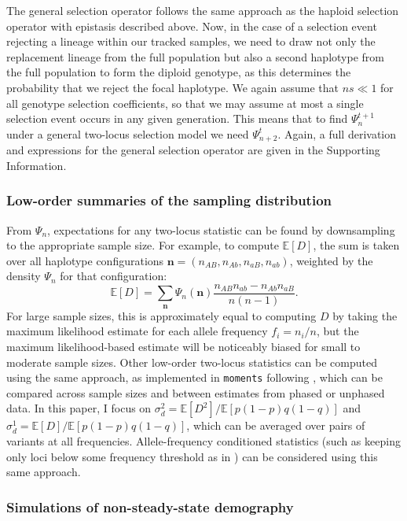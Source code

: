 \documentclass[]{article}
\newcommand{\E}{\mathbb{E}}
\begin{document}
The general selection operator follows the same approach as the haploid
selection operator with epistasis described above. Now, in the case of a
selection event rejecting a lineage within our tracked samples, we need to draw
not only the replacement lineage from the full population but also a second
haplotype from the full population to form the diploid genotype, as this
determines the probability that we reject the focal haplotype. We again assume
that \(ns \ll 1\) for all genotype selection coefficients, so that we may
assume at most a single selection event occurs in any given generation. This
means that to find \(\Psi_n^{t+1}\) under a general two-locus selection model
we need \(\Psi_{n+2}^t\). Again, a full derivation and expressions for the
general selection operator are given in the Supporting Information.

\subsubsection{Low-order summaries of the sampling distribution}

From \(\Psi_n\), expectations for any two-locus statistic can be found by
downsampling to the appropriate sample size. For example, to compute \(\E[D]\),
the sum is taken over all haplotype configurations \(\mathbf{n} = (n_{AB},
n_{Ab}, n_{aB}, n_{ab})\), weighted by the density \(\Psi_n\) for that
configuration:
\begin{equation}
\E[D] = \sum_{\mathbf{n}} \Psi_n(\mathbf{n})
\frac{n_{AB}n_{ab} - n_{Ab}n_{aB}}{n(n-1)}.
\end{equation}
For large sample sizes, this is approximately equal to computing \(D\) by
taking the maximum likelihood estimate for each allele frequency \(f_i = n_i /
n\), but the maximum likelihood-based estimate will be noticeably biased for
small to moderate sample sizes. Other low-order two-locus statistics can be
computed using the same approach, as implemented in \texttt{moments} following
\citet{Ragsdale2020-nz}, which can be compared across sample sizes and between
estimates from phased or unphased data. In this paper, I focus on \(\sigma_d^2
= \E[D^2] / \E[p(1-p)q(1-q)]\) and \(\sigma_d^1 = \E[D] / \E[p(1-p)q(1-q)]\),
which can be averaged over pairs of variants at all frequencies.
Allele-frequency conditioned statistics (such as keeping only loci below some
frequency threshold as in \citet{Good2022-ot}) can be considered using this
same approach.

\subsubsection{Simulations of non-steady-state demography}
\end{document}
